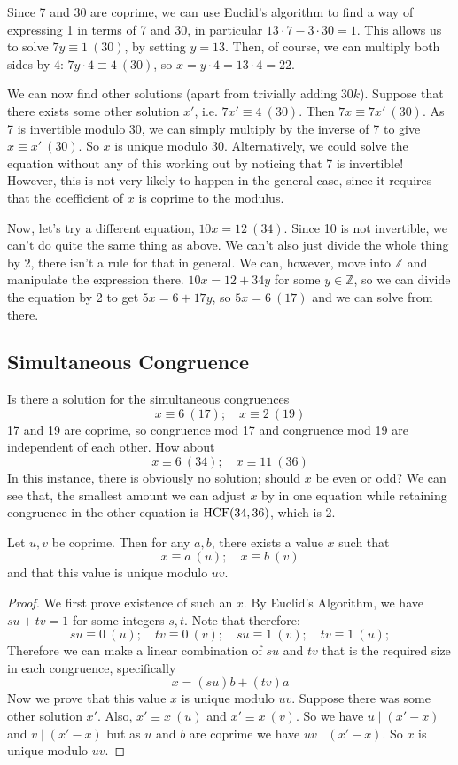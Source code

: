 \documentclass{article}
\begin{document}
Since 7 and 30 are coprime, we can use Euclid's algorithm to find a way of expressing 1 in terms of 7 and 30, in particular $13 \cdot 7 - 3\cdot 30 = 1$. This allows us to solve $7y \equiv 1\ (30)$, by setting $y=13$. Then, of course, we can multiply both sides by 4: $7 y\cdot 4 \equiv 4\ (30)$, so $x = y \cdot 4 = 13 \cdot 4 = 22$.

We can now find other solutions (apart from trivially adding $30k$). Suppose that there exists some other solution $x'$, i.e. $7x' \equiv 4\ (30)$. Then $7x \equiv 7x'\ (30)$. As 7 is invertible modulo 30, we can simply multiply by the inverse of 7 to give $x \equiv x'\ (30)$. So $x$ is unique modulo 30. Alternatively, we could solve the equation without any of this working out by noticing that 7 is invertible! However, this is not very likely to happen in the general case, since it requires that the coefficient of $x$ is coprime to the modulus.

Now, let's try a different equation, $10x = 12\ (34)$. Since 10 is not invertible, we can't do quite the same thing as above. We can't also just divide the whole thing by 2, there isn't a rule for that in general. We can, however, move into $\mathbb Z$ and manipulate the expression there. $10x = 12 + 34y$ for some $y \in \mathbb Z$, so we can divide the equation by 2 to get $5x = 6 + 17y$, so $5x = 6\ (17)$ and we can solve from there.

\subsection{Simultaneous Congruence}
Is there a solution for the simultaneous congruences
\[ x \equiv 6\ (17);\quad x \equiv 2\ (19) \]
17 and 19 are coprime, so congruence mod 17 and congruence mod 19 are independent of each other. How about
\[ x \equiv 6\ (34);\quad x \equiv 11\ (36) \]
In this instance, there is obviously no solution; should $x$ be even or odd? We can see that, the smallest amount we can adjust $x$ by in one equation while retaining congruence in the other equation is $\operatorname{HCF}(34, 36)$, which is 2.
\begin{theorem}
	Let $u, v$ be coprime. Then for any $a, b$, there exists a value $x$ such that
	\[ x \equiv a\ (u);\quad x \equiv b\ (v) \]
	and that this value is unique modulo $uv$.
\end{theorem}
\begin{proof}
	We first prove existence of such an $x$. By Euclid's Algorithm, we have $su + tv = 1$ for some integers $s, t$. Note that therefore:
	\[ su \equiv 0\ (u);\quad tv \equiv 0\ (v);\quad su \equiv 1\ (v);\quad tv \equiv 1\ (u); \]
	Therefore we can make a linear combination of $su$ and $tv$ that is the required size in each congruence, specifically
	\[ x = (su)b + (tv)a \]
	Now we prove that this value $x$ is unique modulo $uv$. Suppose there was some other solution $x'$. Also, $x' \equiv x\ (u)$ and $x' \equiv x\ (v)$. So we have $u\mid (x' - x)$ and $v\mid (x' - x)$ but as $u$ and $b$ are coprime we have $uv\mid (x' - x)$. So $x$ is unique modulo $uv$.
\end{proof}
\end{document}
